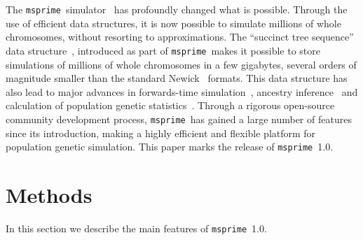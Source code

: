 \documentclass{article}
\newcommand{\msprime}[0]{\texttt{msprime}}
\begin{document}
The \msprime\ simulator~\citep{kelleher2016efficient,kelleher2020coalescent}
has profoundly changed
what is possible. Through the use of efficient data structures, it is
now possible to simulate millions of whole chromosomes, without resorting
to approximations. The ``succinct tree
sequence'' data
structure~\citep{kelleher2016efficient,kelleher2018efficient,kelleher2019inferring},
introduced as part of \msprime\, makes it possible to store simulations
of millions of whole chromosomes in a few gigabytes, several orders
of magnitude smaller than the standard
Newick~\citep{felsenstein1989phylip} formats. This data structure has
also lead to major advances in forwards-time
simulation~\citep{kelleher2018efficient,haller2018tree},
ancestry inference~\citep{kelleher2019inferring}
and calculation of population genetic statistics~\citep{ralph2019efficiently}.
Through a rigorous open-source community development process,
\msprime\ has gained a large number of features since its introduction,
making a highly efficient and flexible platform for population
genetic simulation.
This paper marks the release of \msprime\ 1.0.

%



\section*{Methods}

In this section we describe the main features of \msprime\ 1.0.
\end{document}
